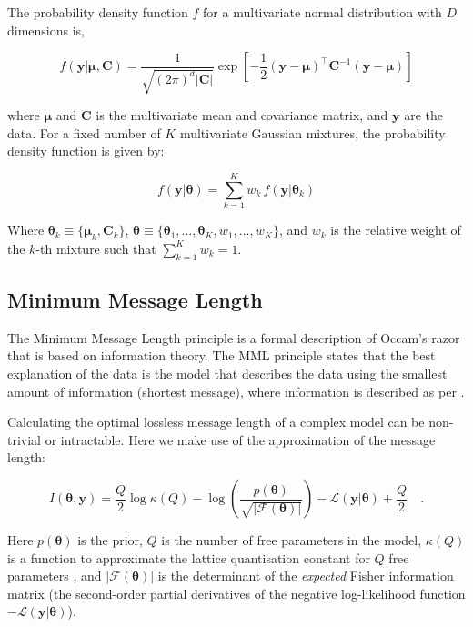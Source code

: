 \documentclass{article}
\newcommand{\vect}[1]{\boldsymbol{\mathbf{#1}}}
\def\veccov{\vect{C}}
\def\vecmean{\vect{\mu}}
\def\vectheta{\vect{\theta}}
\def\weight{w}
\def\datum{y}
\def\data{\vect{\datum}}
\def\likelihood{\mathcal{L}}
\begin{document}
\noindent{}The probability density function $f$ for a multivariate normal 
distribution with $D$ dimensions is,

\begin{equation}
  f(\data|\vecmean,\veccov) 
      = \frac{1}{\sqrt{(2\pi)^d|\veccov|}}
        \exp{\left[-\frac{1}{2}(\data - \vecmean)^\intercal\veccov^{-1}(\data - \vecmean)\right]}
\end{equation}

\noindent{}where $\vecmean$ and $\veccov$ is the multivariate mean and 
covariance matrix, and $\data$ are the data.
For a fixed number of $K$ multivariate Gaussian mixtures, the probability
density function is given by:

\begin{equation}
  f(\data|\vectheta) = \sum_{k=1}^{K} \weight_k \, f(\data|\vectheta_k)
\end{equation}

\noindent{}Where $\vectheta_k \equiv \{\vecmean_k, \veccov_k\}$,
$\vectheta \equiv \{\vectheta_1,\dots,\vectheta_K,\weight_1,\dots,\weight_K\}$, 
and $\weight_k$ is the relative weight of the $k$-th mixture such that
$\sum_{k=1}^{K}\weight_k = 1$.


\subsection{Minimum Message Length}
\label{sec:mml}

The Minimum Message Length \citep[MML;][]{Wallace_1968} principle is a formal
description of Occam's razor that is based on information theory.
The MML principle states that the best explanation of the data is the model
that describes the data using the smallest amount of information (shortest
message), where information is described as per \citet{Shannon_1948}. 


Calculating the optimal lossless message length of a complex model can be
non-trivial or intractable. Here we make use of the \citet{Wallace_1987}
approximation of the message length:

\begin{equation}
\label{eq:message-length}
  I(\vectheta,\data) 
    = \frac{Q}{2}\log\kappa{\left(Q\right)} 
    - \log{\left(\frac{p(\vectheta)}{\sqrt{|\mathcal{F}(\vectheta)|}}\right)}
    - \likelihood\left(\data|\vectheta\right) 
    + \frac{Q}{2} \quad .
\end{equation}

Here $p(\vectheta)$ is the prior, $Q$ is the number of free parameters in the
model, $\kappa\left(Q\right)$ is a function to approximate the lattice
quantisation constant for $Q$ free parameters \citep[e.g.,][]{Conway_1984}, 
and $|\mathcal{F}\left(\vectheta\right)|$ is the determinant of the 
\emph{expected} Fisher information matrix (the second-order partial 
derivatives of the negative log-likelihood function 
$-\likelihood(\data|\vectheta)$).
\end{document}
